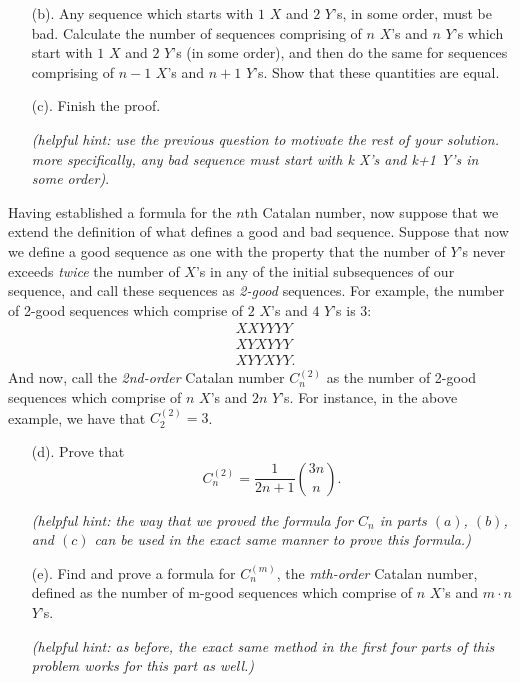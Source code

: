 \documentclass{article}
\newcommand{\V}{

\vspace{\baselineskip}

}
\begin{document}
\begin{potw}
\begin{enumerate}
    \item [(b).] Any sequence which starts with $1$ $X$ and $2$ $Y$'s, in some order, must be bad. Calculate the number of sequences comprising of $n$ $X$'s and $n$ $Y$'s which start with $1$ $X$ and $2$ $Y$'s (in some order), and then do the same for sequences comprising of $n-1$ $X$'s and $n+1$ $Y$'s. Show that these quantities are equal. 
    \item [(c).] Finish the proof. \V
    
    \textit{(helpful hint: use the previous question to motivate the rest of your solution. more specifically, any bad sequence must start with k X's and k+1 Y's in some order)}.
\end{enumerate}

Having established a formula for the $n$th Catalan number, now suppose that we extend the definition of what defines a good and bad sequence. Suppose that now we define a good sequence as one with the property that the number of $Y$'s never exceeds \textit{twice} the number of $X$'s in any of the initial subsequences of our sequence, and call these sequences as \textit{2-good} sequences. For example, the number of 2-good sequences which comprise of $2$ $X$'s and $4$ $Y$'s is $3$: 
\begin{align*}
    &XXYYYY \\
    &XYXYYY \\
    &XYYXYY.
\end{align*}
And now, call the \textit{2nd-order} Catalan number $C_n^{(2)}$ as the number of 2-good sequences which comprise of $n$ $X$'s and $2n$ $Y$'s. For instance, in the above example, we have that $C_2^{(2)} = 3$. 
\begin{enumerate}
    \item [(d).] Prove that 
    \[C_n^{(2)} = \frac{1}{2n+1}\binom{3n}{n}.\]
    
    \textit{(helpful hint: the way that we proved the formula for $C_n$ in parts $(a)$, $(b)$, and $(c)$ can be used in the exact same manner to prove this formula.)}
    \item [(e).] Find and prove a formula for $C_n^{(m)}$, the \textit{mth-order} Catalan number, defined as the number of m-good sequences which comprise of $n$ $X$'s and $m\cdot n$ $Y$'s. \V
    
    \textit{(helpful hint: as before, the exact same method in the first four parts of this problem works for this part as well.)}
\end{enumerate}
\end{potw} 
\end{document}
